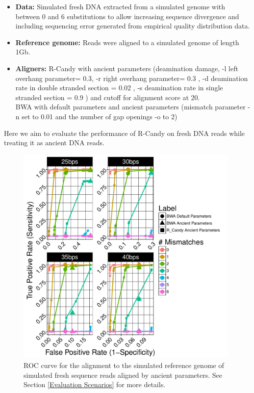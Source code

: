 \documentclass[11pt,a4paper]{report}
\begin{document}
  \begin{itemize}

   \item \textbf{Data:} Simulated fresh DNA extracted from a simulated genome 
   with between 0 and 6 substitutions to allow increasing sequence divergence
   and including sequencing error generated from empirical quality distribution data.
 
   
   \item \textbf{Reference genome:} Reads were aligned to a simulated genome of 
	length 1Gb.

    \item \textbf{Aligners:}
    R-Candy with ancient parameters 
  	(deamination damage, -l left overhang parameter= 0.3, -r right overhang parameter= 0.3 , 
	-d deamination rate in double stranded section = 0.02 , 
	-s deamination rate in single stranded section = 0.9 )
  	and cutoff for alignment score at 20. \\
  	BWA with default parameters and ancient parameters \cite{green2010draft}
   	(mismatch parameter -n set to 0.01 and the number of gap openings -o
   	to 2)
   
   \end{itemize}
 
Here we aim to evaluate the performance of R-Candy on fresh DNA reads 
while treating it as ancient DNA reads.


\begin{figure}[H]
\centering
\includegraphics[width=11cm]{pictures/f_DS8_emp.pdf}
\caption{
ROC curve for the alignment to the simulated reference genome of simulated 
fresh sequence reads aligned by ancient parameters. See Section \ref{Evaluation 
Scenarios} for more details.}
\label{DS8_emp}
\end{figure}
\end{document}

